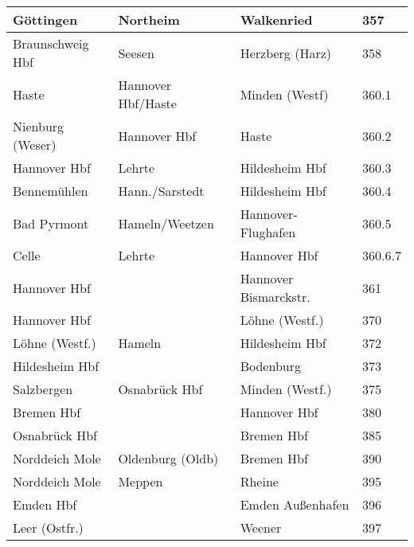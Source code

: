 \begin{multicols}{2}
\begin{tabular}{|l|l|l|p{2cm}|}
Göttingen & Northeim & Walkenried & 357 \footnotemark[1] \\ \hline
Braunschweig Hbf & Seesen & Herzberg (Harz) & 358 \\ \hline
Haste & Hannover Hbf/Haste & Minden (Westf) & 360.1 \\ \hline
Nienburg (Weser) & Hannover Hbf & Haste & 360.2 \\ \hline
Hannover Hbf & Lehrte & Hildesheim Hbf & 360.3 \\ \hline
Bennemühlen & Hann./Sarstedt & Hildesheim Hbf & 360.4 \\ \hline
Bad Pyrmont & Hameln/Weetzen & Hannover-Flughafen & 360.5 \\ \hline
Celle & Lehrte & Hannover Hbf & 360.6.7 \\ \hline
Hannover Hbf &  & Hannover Bismarckstr. & 361 \footnotemark[1] \\ \hline
Hannover Hbf &  & Löhne (Westf.) & 370 \\ \hline
Löhne (Westf.) & Hameln & Hildesheim Hbf & 372 \\ \hline
Hildesheim Hbf &  & Bodenburg & 373 \\ \hline
Salzbergen & Osnabrück Hbf & Minden (Westf.) & 375 \footnotemark[1] \\ \hline
Bremen Hbf &  & Hannover Hbf & 380 \\ \hline
Osnabrück Hbf &  & Bremen Hbf & 385 \footnotemark[1] \\ \hline
Norddeich Mole & Oldenburg (Oldb) & Bremen Hbf & 390 \footnotemark[1] \\ \hline
Norddeich Mole & Meppen & Rheine & 395 \footnotemark[1] \\ \hline
Emden Hbf &  & Emden Außenhafen & 396 \\ \hline
Leer (Ostfr.) &  & Weener & 397 \\ \hline
\end{tabular}

\end{multicols}
